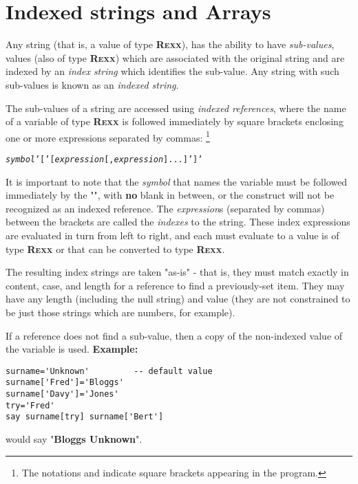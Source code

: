 \section{Indexed strings and Arrays}\label{refinstr}
 
Any \nr{} string (that is, a value of type \textbf{R\textsc{exx}}), has the
ability to have \emph{sub-values}, values (also of type \textbf{R\textsc{exx}})
which are associated with the original string and are indexed by an
\emph{index string} which identifies the sub-value.
Any string with such sub-values is known as an \emph{indexed string}.
 
The sub-values of a \nr{} string are accessed using \emph{indexed
references}, where the name of a variable of type \textbf{R\textsc{exx}} is
followed immediately by square brackets enclosing one or more
expressions separated by commas:
\footnote{
The notations \keyword{'['} and \keyword{']'}
indicate square brackets appearing in the \nr{} program.
}
\begin{shaded}
\begin{alltt}
\emph{symbol}'['[\emph{expression}[, \emph{expression}]...]']'
\end{alltt}
\end{shaded}
It is important to note that the \emph{symbol} that names the
variable must be followed immediately by the "\keyword{[}",
with \textbf{no} blank in between, or the construct will not be
recognized as an indexed reference.
 The \emph{expression}s (separated by commas) between the
brackets are called the \emph{indexes} to the string.
These index expressions are evaluated in turn from left to right, and
each must evaluate to a value is of type \textbf{R\textsc{exx}} or that can be
converted to type \textbf{R\textsc{exx}}.
 
The resulting index strings are taken "as-is" - that is, they
must match exactly in content, case, and length for a reference to find
a previously-set item.
They may have any length (including the null string) and value (they are
not constrained to be just those strings which are numbers, for
example).
 
If a reference does not find a sub-value, then a copy of the non-indexed
value of the variable is used.
 \textbf{Example:}
\begin{lstlisting}
surname='Unknown'         -- default value
surname['Fred']='Bloggs'
surname['Davy']='Jones'
try='Fred'
say surname[try] surname['Bert']
\end{lstlisting}
would say "\textbf{Bloggs Unknown}".
 
